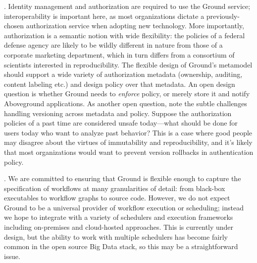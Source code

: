 \documentclass{sig-alternate}
\begin{document}
.  
Identity management and authorization are required to use the Ground service; interoperability is important here, as most organizations dictate a previously-chosen authorization service when adopting new technology.  
More importantly, authorization is a semantic notion with wide flexibility: the policies of a federal defense agency are likely to be wildly different in nature from those of a corporate marketing department, which in turn differs from a consortium of scientists interested in reproducibility.  
The flexible design of Ground's metamodel should support a wide variety of authorization metadata (ownership, auditing, content labeling etc.) and design policy over that metadata.  
An open design question is whether Ground needs to \emph{enforce} policy, or merely store it and notify Aboveground applications.  
As another open question, note the subtle challenges handling versioning across metadata and policy. 
Suppose the authorization policies of a past time are considered unsafe today---what should be done for users today who want to analyze past behavior? 
This is a case where good people may disagree about the virtues of immutability and reproducibility, and it's likely that most organizations would want to prevent version rollbacks in authentication policy. 


. 
We are committed to ensuring that Ground is flexible enough to capture the specification of workflows at many granularities of detail: from black-box executables to workflow graphs to source code.  
However, we do not expect Ground to be a universal provider of workflow execution or scheduling; instead we hope to integrate with a variety of schedulers and execution frameworks including on-premises and cloud-hosted approaches. 
This is currently under design, but the ability to work with multiple schedulers has become fairly common in the open source Big Data stack, so this may be a straightforward issue.
\end{document}
